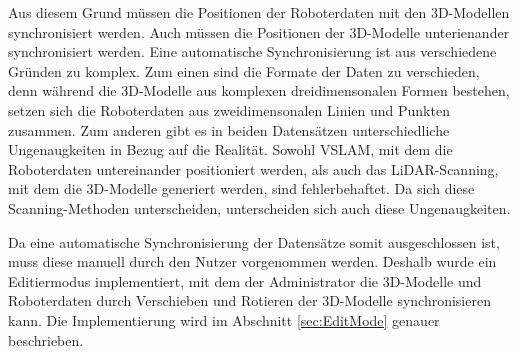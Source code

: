 Aus diesem Grund müssen die Positionen der Roboterdaten mit den 3D-Modellen synchronisiert werden. Auch müssen die Positionen der 3D-Modelle unterienander synchronisiert werden. Eine automatische Synchronisierung ist aus verschiedene Gründen zu komplex. Zum einen sind die Formate der Daten zu verschieden, denn während die 3D-Modelle aus komplexen dreidimensonalen Formen bestehen, setzen sich die Roboterdaten aus zweidimensonalen Linien und Punkten zusammen. Zum anderen gibt es in beiden Datensätzen unterschiedliche Ungenaugkeiten in Bezug auf die Realität. Sowohl \ac{VSLAM}, mit dem die Roboterdaten untereinander positioniert werden, als auch das \ac{LiDAR}-Scanning, mit dem die 3D-Modelle generiert werden, sind fehlerbehaftet. Da sich diese Scanning-Methoden unterscheiden, unterscheiden sich auch diese Ungenaugkeiten.

Da eine automatische Synchronisierung der Datensätze somit ausgeschlossen ist, muss diese manuell durch den Nutzer vorgenommen werden. Deshalb wurde ein Editiermodus implementiert, mit dem der Administrator die 3D-Modelle und Roboterdaten durch Verschieben und Rotieren der 3D-Modelle synchronisieren kann. Die Implementierung wird im Abschnitt \ref{sec:EditMode} genauer beschrieben.
